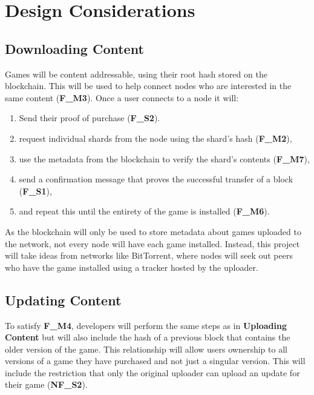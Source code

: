 \newpage
\section{Design Considerations}







\subsection*{Downloading Content}

Games will be content addressable, using their root hash stored on the blockchain. This will be used to help connect nodes who are interested in the same content (\textbf{F\_M3}). Once a user connects to a node it will:
\vspace{2mm}
\begin{enumerate}
  \item Send their proof of purchase (\textbf{F\_S2}).
  \item request individual shards from the node using the shard's hash (\textbf{F\_M2}),
  \item use the metadata from the blockchain to verify the shard's contents (\textbf{F\_M7}),
  \item send a confirmation message that proves the successful transfer of a block (\textbf{F\_S1}),
  \item and repeat this until the entirety of the game is installed (\textbf{F\_M6}).
\end{enumerate}

\vspace{2mm}\noindent As the blockchain will only be used to store metadata about games uploaded to the network, not every node will have each game installed. Instead, this project will take ideas from networks like BitTorrent, where nodes will seek out peers who have the game installed using a tracker hosted by the uploader.

\subsection*{Updating Content}

To satisfy \textbf{F\_M4}, developers will perform the same steps as in \textbf{Uploading Content} but will also include the hash of a previous block that contains the older version of the game. This relationship will allow users ownership to all versions of a game they have purchased and not just a singular version. This will include the restriction that only the original uploader can upload an update for their game (\textbf{NF\_S2}).

